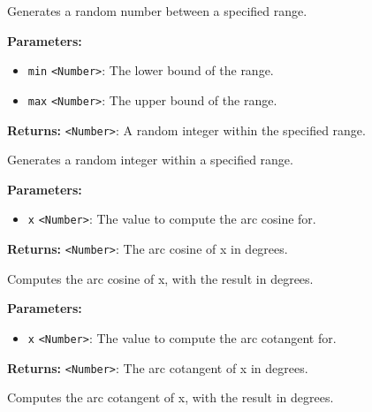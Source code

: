 \documentclass[12pt,a4paper]{article}
\begin{document}
\noindent Generates a random number between a specified range.

\vspace{5mm}
\noindent {}


\noindent \textbf{Parameters:}
\begin{itemize}
  \item \texttt{min} \texttt{<Number>}: The lower bound of the range.
  \item \texttt{max} \texttt{<Number>}: The upper bound of the range.
\end{itemize}

\noindent \textbf{Returns:} \texttt{<Number>}: A random integer within the specified range.

\noindent Generates a random integer within a specified range.

\vspace{5mm}
\noindent {}


\noindent \textbf{Parameters:}
\begin{itemize}
  \item \texttt{x} \texttt{<Number>}: The value to compute the arc cosine for.
\end{itemize}

\noindent \textbf{Returns:} \texttt{<Number>}: The arc cosine of x in degrees.

\noindent Computes the arc cosine of x, with the result in degrees.

\vspace{5mm}
\noindent {}


\noindent \textbf{Parameters:}
\begin{itemize}
  \item \texttt{x} \texttt{<Number>}: The value to compute the arc cotangent for.
\end{itemize}

\noindent \textbf{Returns:} \texttt{<Number>}: The arc cotangent of x in degrees.

\noindent Computes the arc cotangent of x, with the result in degrees.

\vspace{5mm}
\noindent {}
\end{document}
